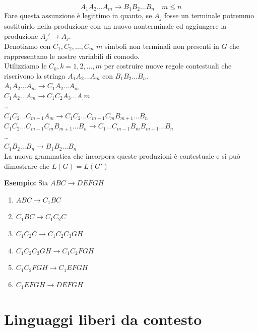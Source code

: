 \documentclass[12pt]{report}
\begin{document}
{{{\begin{itemize}
				\[
				A_1A_2\dots A_m\to B_1B_2 \dots B_n \quad m \leq n
				\]
				Fare questa assunzione è legittimo in quanto, se $A_j$ fosse un terminale potremmo sostituirlo nella produzione con un nuovo nonterminale ed aggiungere la produzione $A_j' \to A_j$. \\
				Denotiamo con $C_1, C_2, \dots, C_m$ $m$ simboli non terminali non presenti in $G$ che rappresentano le nostre variabili di comodo. \\
				Utilizziamo le $C_k, k=1,2,\dots, m$ per costruire nuove regole contestuali che riscrivono la stringa $A_1A_2\dots A_m$ con $B_1B_2\dots B_n$. \\
				$A_1A_2\dots A_m \to C_1A_2 \dots A_m$ \\
				$C_1A_2 \dots A_m \to C_1C_2A_3 \dots A_,m$ \\
				\dots \\
				$C_1C_2\dots C_{m-1}A_m \to C_1C_2\dots C_{m-1}C_mB_{m+1}\dots B_n$ \\
				$C_1C_2 \dots C_{m-1}C_mB_{m+1}\dots B_n \to C_1\dots C_{m-1}B_mB_{m+1}\dots B_n$ \\
				\dots \\
				$C_1B_2\dots B_n \to B_1B_2\dots B_n$ \\
				La nuova grammatica che incorpora queste produzioni è contestuale e si può dimostrare che $L(G) = L(G')$
			\end{itemize}

		}
	}
	}
	\textbf{Esempio:} Sia $ABC \to DEFGH$
	\begin{enumerate}
		\item $ABC \to C_1BC$
		\item $C_1BC \to C_1C_2C$
		\item $C_1C_2C \to C_1C_2C_3GH$
		\item $C_1C_2C_3GH \to C_1C_2FGH$
		\item $C_1C_2FGH \to C_1EFGH$
		\item $C_1EFGH \to DEFGH$
	\end{enumerate}
	\chapter{Linguaggi liberi da contesto}
\end{document}
